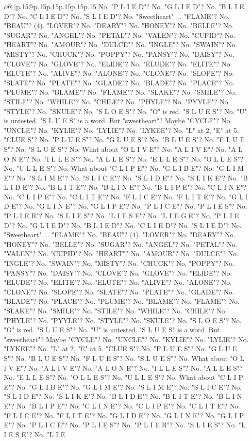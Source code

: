 \documentclass{article}
\begin{document}
{\begin{supertabular}{c@{$\;$}|p{.15\linewidth}@{}p{.15\linewidth}p{.15\linewidth}p{.15\linewidth}p{.15\linewidth}p{.15\linewidth}}
{{{No. "P L I E D"? No. "G L I E D"? No. "B L I E D"? No. "C L I E D"? No. "S L I E D"? No. "Sweetheart" ... "FLAME"? No. "BEAU"? (4). "LOVER"? No. "DEARY"? No. "HONEY"? No. "BELLE"? No. "SUGAR"? No. "ANGEL"? No. "PETAL"? No. "VALEN"? No. "CUPID"? No. "HEART"? No. "AMOUR"? No. "DULCE"? No. "INGLE"? No. "SWAIN"? No. "MISTY"? No. "CHUCK"? No. "POPPY"? No. "PANSY"? No. "DAISY"? No. "CLOVE"? No. "GLOVE"? No. "ELIDE"? No. "ELUDE"? No. "ELITE"? No. "ELUTE"? No. "ALIVE"? No. "ALONE"? No. "CLONE"? No. "SLOPE"? No. "SLATE"? No. "PLATE"? No. "GLADE"? No. "BLADE"? No. "PLACE"? No. "PLUME"? No. "BLAME"? No. "FLAME"? No. "SLAKE"? No. "SMILE"? No. "STILE"? No. "WHILE"? No. "CHILE"? No. "PHYLE"? No. "PYYLE"? No. "STYLE"? No. "SKULE"? No. "S L O E S"? No. "O" is red. "S L U E S"? No. "U" is untested. "S L U E S" is a word. But "sweetheart"? Maybe "CYCLE"? No. "UNCLE"? No. "KYLIE"? No. "LYLIE"? No. "LYKEE"? No. "L" at 2, "E" at 5. "CLUE S"? No. "P L U E S"? No. "G L U E S"? No. "B L U E S"? No. "F L U E S"? No. "S L U E S"? No. What about "O L I V E"? No. "A L I V E"? No. "A L O N E"? No. "I L L E S"? No. "A L L E S"? No. "E L L E S"? No. "O L L E S"? No. "U L L E S"? No. What about "C L I P E"? No. "G L I B E"? No. "G L I M E"? No. "S L I M E"? No. "S L I C E"? No. "S L I D E"? No. "S L I K E"? No. "B L I D E"? No. "B L I T E"? No. "B L I N E"? No. "B L I P E"? No. "C L I N E"? No. "C L I P E"? No. "C L I T E"? No. "F L I C E"? No. "F L I T E"? No. "G L I D E"? No. "G L I N E"? No. "G L I P E"? No. "P L I C E"? No. "P L I E S"? No. "P L I E R"? No. "S L I E S"? No. "L I E S E"? No. "L I E G E"? No. "P L I E D"? No. "G L I E D"? No. "B L I E D"? No. "C L I E D"? No. "S L I E D"? No. "Sweetheart" ... "FLAME"? No. "BEAU"? (4). "LOVER"? No. "DEARY"? No. "HONEY"? No. "BELLE"? No. "SUGAR"? No. "ANGEL"? No. "PETAL"? No. "VALEN"? No. "CUPID"? No. "HEART"? No. "AMOUR"? No. "DULCE"? No. "INGLE"? No. "SWAIN"? No. "MISTY"? No. "CHUCK"? No. "POPPY"? No. "PANSY"? No. "DAISY"? No. "CLOVE"? No. "GLOVE"? No. "ELIDE"? No. "ELUDE"? No. "ELITE"? No. "ELUTE"? No. "ALIVE"? No. "ALONE"? No. "CLONE"? No. "SLOPE"? No. "SLATE"? No. "PLATE"? No. "GLADE"? No. "BLADE"? No. "PLACE"? No. "PLUME"? No. "BLAME"? No. "FLAME"? No. "SLAKE"? No. "SMILE"? No. "STILE"? No. "WHILE"? No. "CHILE"? No. "PHYLE"? No. "PYYLE"? No. "STYLE"? No. "SKULE"? No. "S L O E S"? No. "O" is red. "S L U E S"? No. "U" is untested. "S L U E S" is a word. But "sweetheart"? Maybe "CYCLE"? No. "UNCLE"? No. "KYLIE"? No. "LYLIE"? No. "LYKEE"? No. "L" at 2, "E" at 5. "CLUE S"? No. "P L U E S"? No. "G L U E S"? No. "B L U E S"? No. "F L U E S"? No. "S L U E S"? No. What about "O L I V E"? No. "A L I V E"? No. "A L O N E"? No. "I L L E S"? No. "A L L E S"? No. "E L L E S"? No. "O L L E S"? No. "U L L E S"? No. What about "C L I P E"? No. "G L I B E"? No. "G L I M E"? No. "S L I M E"? No. "S L I C E"? No. "S L I D E"? No. "S L I K E"? No. "B L I D E"? No. "B L I T E"? No. "B L I N E"? No. "B L I P E"? No. "C L I N E"? No. "C L I P E"? No. "C L I T E"? No. "F L I C E"? No. "F L I T E"? No. "G L I D E"? No. "G L I N E"? No. "G L I P E"? No. "P L I C E"? No. "P L I E S"? No. "P L I E R"? No. "S L I E S"? No. "L I E S E"? No. "L I E }}}
\end{supertabular}}
\end{document}
